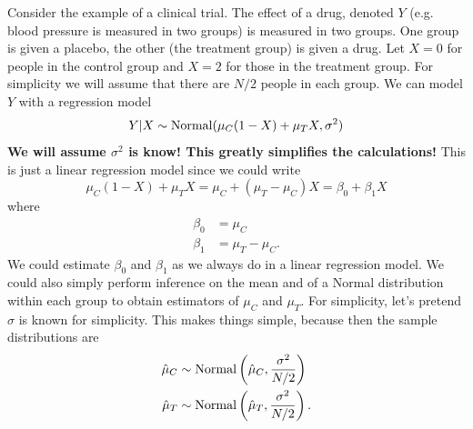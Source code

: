 \begin{itemize}
\begin{example}
Consider the example of a clinical trial. The effect of a drug, denoted $Y$ (e.g. blood pressure is measured in two groups) is measured in two groups.  One group is given a placebo, the other (the treatment group) is given a drug. Let $X=0$ for people in the control group and $X=2$ for those in the treatment group.   For simplicity we will assume that there are $N/2$ people in each group. We can model $Y$ with a regression model 
\begin{equation*}
Y|X \sim{\rm Normal}(\mu_C (1-X) + \mu_T X,\sigma^2)
\end{equation*}
{\bf We will assume $\sigma^2$ is know! This greatly simplifies the calculations!}
This is just a linear regression model since we could write
\begin{equation*}
\mu_C (1-X) + \mu_T X = \mu_C + (\mu_T-\mu_C)X = \beta_0 + \beta_1 X
\end{equation*}
where
\begin{align*}
\beta_0 &= \mu_C\\
\beta_1 &= \mu_T - \mu_C.
\end{align*}
We could estimate $\beta_0$ and $\beta_1$ as we always do in a linear regression model. We could also simply perform inference on the mean and of a Normal distribution within each group to obtain estimators of $\mu_C$ and $\mu_T$. For simplicity, let's pretend $\sigma$ is known for simplicity. This makes things simple, because then the sample distributions are 
 \begin{align*}
 \hat{\mu}_C &\sim {\rm Normal}\left(\hat{\mu}_C,\frac{\sigma^2}{N/2}\right)\\
  \hat{\mu}_T &\sim {\rm Normal}\left(\hat{\mu}_T,\frac{\sigma^2}{N/2}\right). 
 \end{align*}
 

\end{example}
\end{itemize}
